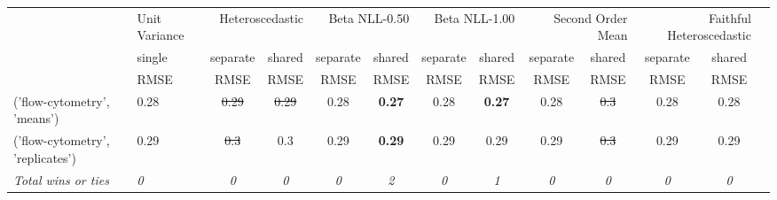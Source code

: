 \begin{tabular}{ll|c|cc|cc|cc|cc|cc}
\toprule
{} & {Unit Variance} & \multicolumn{2}{r}{Heteroscedastic} & \multicolumn{2}{r}{Beta NLL-0.50} & \multicolumn{2}{r}{Beta NLL-1.00} & \multicolumn{2}{r}{Second Order Mean} & \multicolumn{2}{r}{Faithful Heteroscedastic} \\
{} & {single} & {separate} & {shared} & {separate} & {shared} & {separate} & {shared} & {separate} & {shared} & {separate} & {shared} \\
{} & {RMSE} & {RMSE} & {RMSE} & {RMSE} & {RMSE} & {RMSE} & {RMSE} & {RMSE} & {RMSE} & {RMSE} & {RMSE} \\
\midrule
('flow-cytometry', 'means') & 0.28 & \sout{0.29} & \sout{0.29} & 0.28 & \textbf{0.27} & 0.28 & \textbf{0.27} & 0.28 & \sout{0.3} & 0.28 & 0.28 \\
('flow-cytometry', 'replicates') & 0.29 & \sout{0.3} & 0.3 & 0.29 & \textbf{0.29} & 0.29 & 0.29 & 0.29 & \sout{0.3} & 0.29 & 0.29 \\
\textit{{Total wins or ties}} & \textit{0} & \textit{0} & \textit{0} & \textit{0} & \textit{2} & \textit{0} & \textit{1} & \textit{0} & \textit{0} & \textit{0} & \textit{0} \\
\bottomrule
\end{tabular}
